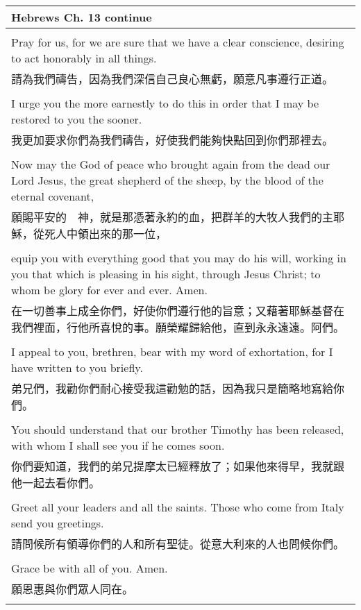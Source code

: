 \documentclass{book}
\begin{document}
\newpage

\begin{tabularx}{\textwidth}{p{}}
\hline
Hebrews Ch. 13 continue \\
\hline \\
Pray for us, for we are sure that we have a clear conscience, desiring to act honorably in all things. \\
請為我們禱告，因為我們深信自己良心無虧，願意凡事遵行正道。 \\ \\
I urge you the more earnestly to do this in order that I may be restored to you the sooner. \\
我更加要求你們為我們禱告，好使我們能夠快點回到你們那裡去。 \\ \\
Now may the God of peace who brought again from the dead our Lord Jesus, the great shepherd of the sheep, by the blood of the eternal covenant, \\
願賜平安的　神，就是那憑著永約的血，把群羊的大牧人我們的主耶穌，從死人中領出來的那一位， \\ \\
equip you with everything good that you may do his will, working in you that which is pleasing in his sight, through Jesus Christ; to whom be glory for ever and ever. Amen. \\
在一切善事上成全你們，好使你們遵行他的旨意；又藉著耶穌基督在我們裡面，行他所喜悅的事。願榮耀歸給他，直到永永遠遠。阿們。 \\ \\
I appeal to you, brethren, bear with my word of exhortation, for I have written to you briefly. \\
弟兄們，我勸你們耐心接受我這勸勉的話，因為我只是簡略地寫給你們。 \\ \\
You should understand that our brother Timothy has been released, with whom I shall see you if he comes soon. \\
你們要知道，我們的弟兄提摩太已經釋放了；如果他來得早，我就跟他一起去看你們。 \\ \\
Greet all your leaders and all the saints. Those who come from Italy send you greetings. \\
請問候所有領導你們的人和所有聖徒。從意大利來的人也問候你們。 \\ \\
Grace be with all of you. Amen. \\
願恩惠與你們眾人同在。 \\ \\

\hline
\end{tabularx}
\end{document}

